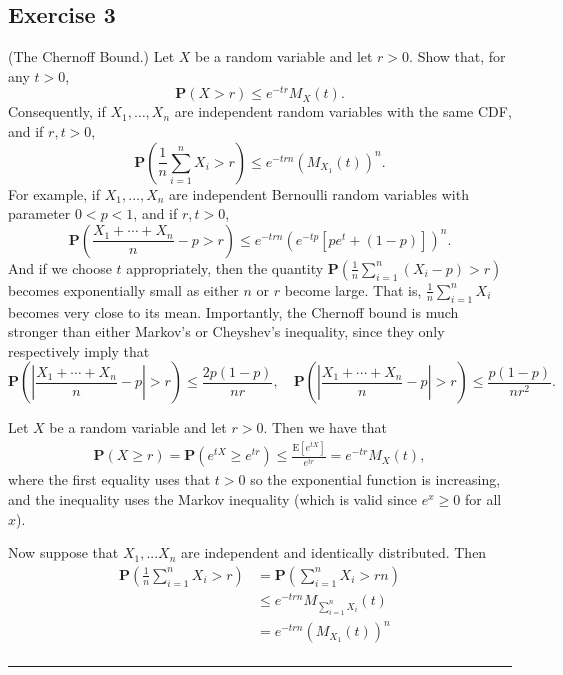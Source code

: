 \documentclass{article}
\theoremstyle{break}
\renewenvironment{proof}{{\bf Proof:}}{\hfill\rule{2mm}{2mm}}
\newcommand{\E}{\mathrm{E}}
\renewcommand{\P}{\mathbf{P}}
\begin{document}
\subsection*{Exercise 3}
(The Chernoff Bound.)
Let $X$ be a random variable and let $r>0$.  Show that, for any $t>0$,
\[\P(X>r)\leq e^{-tr}M_{X}(t).\]
Consequently, if $X_{1},\ldots,X_{n}$ are independent random variables with the same CDF, and if $r,t>0$,
\[\P\left(\frac{1}{n}\sum_{i=1}^{n}X_{i}>r\right)\leq e^{-trn}(M_{X_{1}}(t))^{n}.\]
For example, if $X_{1},\ldots,X_{n}$ are independent Bernoulli random variables with parameter $0<p<1$,  and if $r,t>0$,
\[\P\left(\frac{X_{1}+\cdots+X_{n}}{n}-p>r\right)\leq e^{-trn} (e^{-tp}[pe^t + (1-p)])^n.\]
And if we choose $t$ appropriately,
 then the quantity $\P\left(\frac{1}{n}\sum_{i=1}^{n}(X_{i}-p)>r\right)$ becomes exponentially small as either $n$ or $r$ become large.  That is, $\frac{1}{n}\sum_{i=1}^{n}X_{i}$ becomes very close to its mean.  Importantly, the Chernoff bound is much stronger than either Markov's or Cheyshev's inequality, since they only respectively imply that
\[\P\left( \left| \frac{X_{1}+\cdots+X_{n}}{n}-p \right| > r \right) \leq \frac{2p(1-p)}{nr},   %
\quad\P \left( \left| \frac{X_{1}+\cdots+X_{n}}{n}-p \right| >r\right)\leq \frac{p(1-p)}{nr^{2}}.\] %
%

\begin{proof}
  Let $X$ be a random variable and let $r > 0$. Then we have that
  \begin{align*}
    \P(X \geq r) = \P(e^{tX} \geq e^{tr}) \leq \frac{\E[e^{tX}]}{e^{tr}} = e^{-tr} M_X(t),
  \end{align*}
  where the first equality uses that $t > 0$ so the exponential function is increasing, and the inequality uses the Markov inequality (which is valid since $e^x \geq 0$ for all $x$).

  Now suppose that $X_1, ... X_n$ are independent and identically distributed. Then
  \begin{align*}
    \P \left( \frac{1}{n} \sum_{i=1}^n X_i > r \right) &= \P \left( \sum_{i=1}^n X_i > rn \right)\\
    &\leq e^{-trn} M_{ \sum_{i=1}^n X_i} (t) \\
    &= e^{-trn} \left(M_{X_1} (t)\right)^n \\
  \end{align*}
\end{proof}
\end{document}
